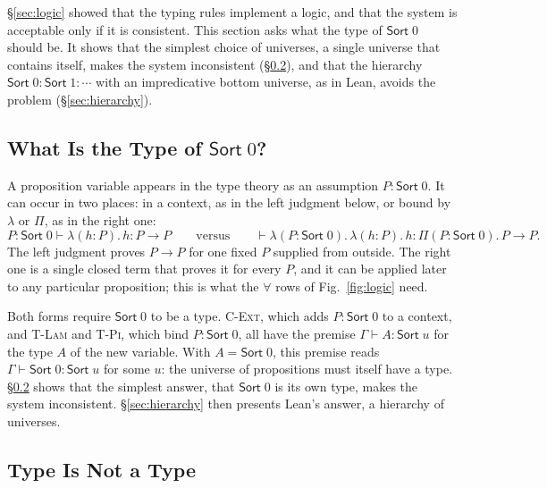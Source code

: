 \documentclass[acmsmall,screen,nonacm]{acmart}
\newcommand{\Sort}[1]{\mathsf{Sort}\;#1}
\newcommand{\tPi}[3]{\Pi(#1{:}#2).\,#3}
\newcommand{\tLam}[3]{\lambda(#1{:}#2).\,#3}
\begin{document}
\S\ref{sec:logic} showed that the typing rules implement a logic, and that the system is acceptable only if it is consistent.
This section asks what the type of $\Sort{0}$ should be.
It shows that the simplest choice of universes, a single universe that contains itself, makes the system inconsistent (\S\ref{sec:typetype}),
and that the hierarchy $\Sort{0} : \Sort{1} : \cdots$ with an impredicative bottom universe, as in Lean, avoids the problem (\S\ref{sec:hierarchy}).

\subsection{What Is the Type of $\Sort{0}$?}

A proposition variable appears in the type theory as an assumption $P : \Sort{0}$.
It can occur in two places: in a context, as in the left judgment below, or bound by $\lambda$ or $\Pi$, as in the right one:
\[
P : \Sort{0} \vdash \tLam{h}{P}{h} : P \to P
\qquad\text{versus}\qquad
\vdash \tLam{P}{\Sort{0}}{\tLam{h}{P}{h}} : \tPi{P}{\Sort{0}}{P \to P}.
\]
The left judgment proves $P \to P$ for one fixed $P$ supplied from outside.
The right one is a single closed term that proves it for every $P$, and it can be applied later to any particular proposition;
this is what the $\forall$ rows of Fig.~\ref{fig:logic} need.

Both forms require $\Sort{0}$ to be a type.
\textsc{C-Ext}, which adds $P : \Sort{0}$ to a context, and \textsc{T-Lam} and \textsc{T-Pi}, which bind $P : \Sort{0}$, all have the premise $\Gamma \vdash A : \Sort{u}$ for the type $A$ of the new variable.
With $A = \Sort{0}$, this premise reads $\Gamma \vdash \Sort{0} : \Sort{u}$ for some $u$: the universe of propositions must itself have a type.
\S\ref{sec:typetype} shows that the simplest answer, that $\Sort{0}$ is its own type, makes the system inconsistent.
\S\ref{sec:hierarchy} then presents Lean's answer, a hierarchy of universes.

\subsection{Type Is Not a Type}
\label{sec:typetype}
\end{document}
